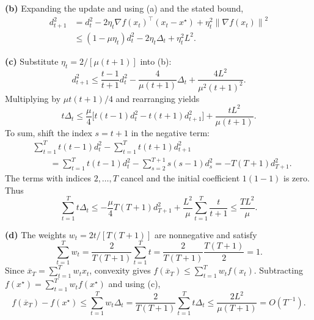 \documentclass[11pt]{article}
\newcommand{\norm}[1]{\left\lVert#1\right\rVert}
\begin{document}
\textbf{(b)} Expanding the update and using (a) and the stated bound,
\begin{align*}
 d_{t+1}^2
 &=d_t^2-2\eta_t\nabla f(x_t)^\top(x_t-x^\star)
 +\eta_t^2\norm{\nabla f(x_t)}^2\\
 &\leq(1-\mu\eta_t)d_t^2-2\eta_t\Delta_t+\eta_t^2L^2.
\end{align*}

\textbf{(c)} Substitute $\eta_t=2/[\mu(t+1)]$ into (b):
\[
 d_{t+1}^2\leq\frac{t-1}{t+1}d_t^2
 -\frac4{\mu(t+1)}\Delta_t+\frac{4L^2}{\mu^2(t+1)^2}.
\]
Multiplying by $\mu t(t+1)/4$ and rearranging yields
\[
 t\Delta_t\leq\frac\mu4
 \big[t(t-1)d_t^2-t(t+1)d_{t+1}^2\big]
 +\frac{tL^2}{\mu(t+1)}.
\]
To sum, shift the index $s=t+1$ in the negative term:
\begin{align*}
 &\sum_{t=1}^T t(t-1)d_t^2-\sum_{t=1}^T t(t+1)d_{t+1}^2\\
 &\qquad=\sum_{t=1}^T t(t-1)d_t^2
 -\sum_{s=2}^{T+1}s(s-1)d_s^2
 =-T(T+1)d_{T+1}^2.
\end{align*}
The terms with indices $2,\ldots,T$ cancel and the initial coefficient
$1(1-1)$ is zero. Thus
\[
 \sum_{t=1}^T t\Delta_t
 \leq-\frac\mu4 T(T+1)d_{T+1}^2
 +\frac{L^2}\mu\sum_{t=1}^T\frac t{t+1}
 \leq\frac{TL^2}\mu.
\]

\textbf{(d)} The weights $w_t=2t/[T(T+1)]$ are nonnegative and satisfy
\[
 \sum_{t=1}^T w_t=\frac2{T(T+1)}\sum_{t=1}^Tt
 =\frac2{T(T+1)}\frac{T(T+1)}2=1.
\]
Since $\overline x_T=\sum_{t=1}^T w_t x_t$, convexity gives
$f(\overline x_T)\leq\sum_{t=1}^T w_t f(x_t)$.
Subtracting $f(x^\star)=\sum_{t=1}^T w_t f(x^\star)$ and using (c),
\[
 f(\overline x_T)-f(x^\star)
 \leq\sum_{t=1}^T w_t\Delta_t
 =\frac2{T(T+1)}\sum_{t=1}^Tt\Delta_t
 \leq\boxed{\frac{2L^2}{\mu(T+1)}}=O(T^{-1}).
\]
\end{document}
